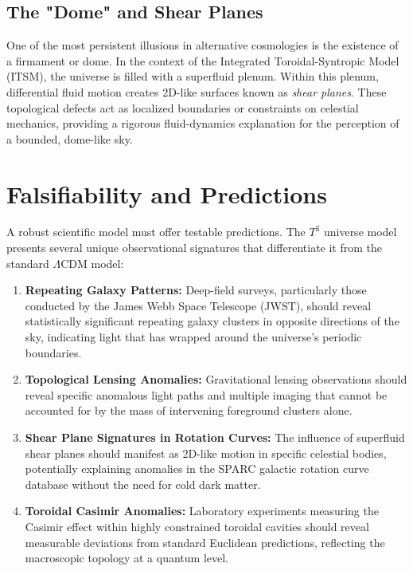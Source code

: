 \documentclass[aps,prd,11pt,onecolumn,superscriptaddress,nofootinbib,floatfix]{revtex4-2}
\begin{document}
\subsection{The "Dome" and Shear Planes}
One of the most persistent illusions in alternative cosmologies is the existence of a firmament or dome. In the context of the Integrated Toroidal-Syntropic Model (ITSM), the universe is filled with a superfluid plenum. Within this plenum, differential fluid motion creates 2D-like surfaces known as \textit{shear planes}. These topological defects act as localized boundaries or constraints on celestial mechanics, providing a rigorous fluid-dynamics explanation for the perception of a bounded, dome-like sky.

\section{Falsifiability and Predictions}
\label{sec:predictions}

A robust scientific model must offer testable predictions. The $T^3$ universe model presents several unique observational signatures that differentiate it from the standard $\Lambda$CDM model:

\begin{enumerate}
    \item \textbf{Repeating Galaxy Patterns:} Deep-field surveys, particularly those conducted by the James Webb Space Telescope (JWST), should reveal statistically significant repeating galaxy clusters in opposite directions of the sky, indicating light that has wrapped around the universe's periodic boundaries.
    \item \textbf{Topological Lensing Anomalies:} Gravitational lensing observations should reveal specific anomalous light paths and multiple imaging that cannot be accounted for by the mass of intervening foreground clusters alone.
    \item \textbf{Shear Plane Signatures in Rotation Curves:} The influence of superfluid shear planes should manifest as 2D-like motion in specific celestial bodies, potentially explaining anomalies in the SPARC galactic rotation curve database \cite{sparc_2016} without the need for cold dark matter.
    \item \textbf{Toroidal Casimir Anomalies:} Laboratory experiments measuring the Casimir effect \cite{casimir_1948} within highly constrained toroidal cavities should reveal measurable deviations from standard Euclidean predictions, reflecting the macroscopic topology at a quantum level.
\end{enumerate}
\end{document}

